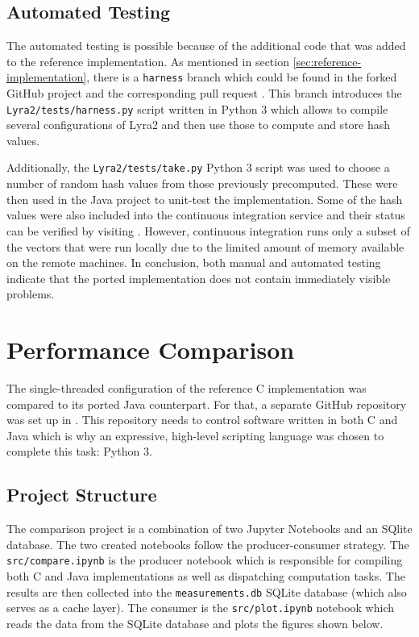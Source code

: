 \subsection{Automated Testing}
\label{sec:automated-testing}

The automated testing is possible because of the additional code that was added to the reference implementation. As mentioned in section \ref{sec:reference-implementation}, there is a \verb|harness| branch which could be found in the forked GitHub project \cite{github:2017:lyra-copy} and the corresponding pull request \cite{github:2017:lyra-pr}. This branch introduces the \verb|Lyra2/tests/harness.py| script written in Python 3 which allows to compile several configurations of Lyra2 and then use those to compute and store hash values.

Additionally, the \verb|Lyra2/tests/take.py| Python 3 script was used to choose a number of random hash values from those previously precomputed. These were then used in the Java project to unit-test the implementation. Some of the hash values were also included into the continuous integration service and their status can be verified by visiting \cite{travis:2017:lyra}. However, continuous integration runs only a subset of the vectors that were run locally due to the limited amount of memory available on the remote machines. In conclusion, both manual and automated testing indicate that the ported implementation does not contain immediately visible problems.

\section{Performance Comparison}
\label{sec:performance-comparison}

The single-threaded configuration of the reference C implementation was compared to its ported Java counterpart. For that, a separate GitHub repository was set up in \cite{github:2017:lyra2-compare}. This repository needs to control software written in both C and Java which is why an expressive, high-level scripting language was chosen to complete this task: Python 3.

\subsection{Project Structure}

The comparison project \cite{github:2017:lyra2-compare} is a combination of two Jupyter Notebooks \cite{jupyter:2017:jupyter} and an SQlite database. The two created notebooks follow the producer-consumer strategy. The \texttt{src/compare.ipynb} is the producer notebook which is responsible for compiling both C and Java implementations as well as dispatching computation tasks. The results are then collected into the \texttt{measurements.db} SQLite database (which also serves as a cache layer). The consumer is the \texttt{src/plot.ipynb} notebook which reads the data from the SQLite database and plots the figures shown below.

